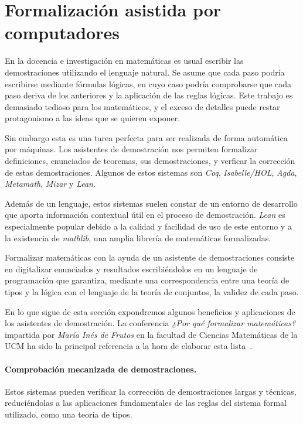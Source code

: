 \section{Formalización asistida por computadores}

En la docencia e investigación en matemáticas es usual escribir las
demostraciones utilizando el lenguaje natural. Se asume que cada paso podría
escribirse mediante fórmulas lógicas, en cuyo caso podría comprobarse que cada
paso deriva de los anteriores y la aplicación de las reglas lógicas. Este
trabajo es demasiado tedioso para los matemáticos, y el exceso
de detalles puede restar protagonismo a las ideas que se quieren exponer.

Sin embargo esta es una tarea perfecta para ser realizada de forma automática
por máquinas. Los asistentes de demostración nos permiten formalizar
definiciones, enunciados de teoremas, sus demostraciones, y verficar la
corrección de estas demostraciones. Algunos de estos sistemas son \textit{Coq},
\textit{Isabelle/HOL},  \textit{Agda}, \textit{Metamath}, \textit{Mizar} y
\textit{Lean}.

Además de un lenguaje, estos sistemas suelen constar de un entorno de desarrollo
que aporta información contextual útil en el proceso de demostración.
\textit{Lean} es especialmente popular debido a la calidad y facilidad de uso de
este entorno y a la existencia de \textit{mathlib}, una amplia librería de
matemáticas formalizadas.

Formalizar matemáticas con la ayuda de un asistente de demostraciones consiste
en digitalizar enunciados y resultados escribiéndolos en un lenguaje de
programación que garantiza, mediante una correspondencia entre una teoría de
tipos y la lógica con el lenguaje de la teoría de conjuntos, la validez de cada
paso. 

En lo que sigue de esta sección expondremos algunos beneficios y aplicaciones
de los asistentes de demostración. La conferencia \textit{¿Por qué formalizar
	matemáticas?} impartida por \textit{María Inés de Frutos} en la facultad de
Ciencias Matemáticas de la UCM ha sido la principal referencia a la hora de
elaborar esta lista~\cite{defrutosPorQueFormalizar2023a}.

\paragraph{Comprobación mecanizada de demostraciones.}

Estos sistemas pueden verificar la corrección de demostraciones largas y
técnicas, reduciéndolas a las aplicaciones fundamentales de las reglas del
sistema formal utilizado, como una teoría de tipos.

